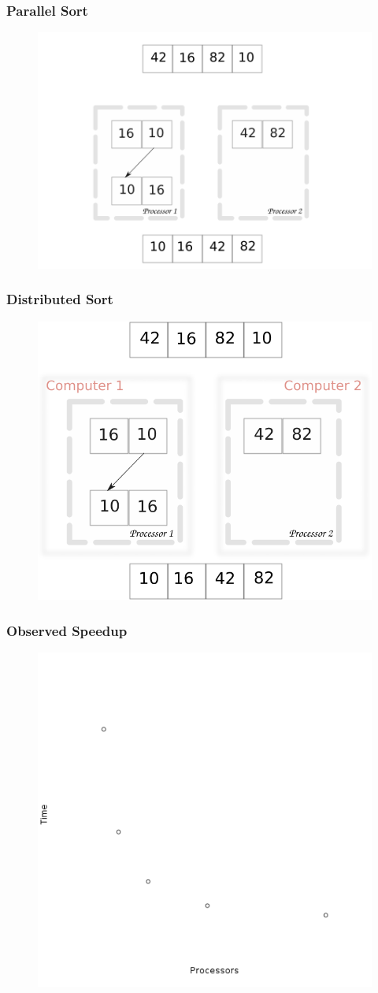 
\begin{frame}
		\frametitle{Parallel Sort}
		\begin{figure}
				\includegraphics[width=0.8\linewidth]{figures/diagrams/sort/parallelsort}
		\end{figure}
\end{frame}

\begin{frame}
		\frametitle{Distributed Sort}
		\begin{figure}
			\includegraphics[width=0.7\linewidth]{figures/diagrams/sort/distributedsort}
		\end{figure}
\end{frame}

\begin{frame}
		\frametitle{Observed Speedup}
			\begin{figure}
					\includegraphics[width=0.5\linewidth]{figures/mpi/mpi}
			\end{figure}
\end{frame}

